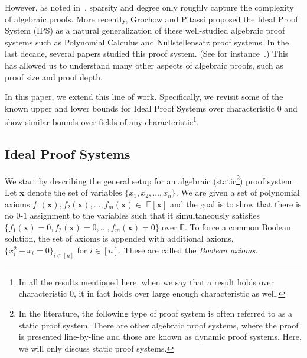 \documentclass[11pt]{article}
\newcommand{\xbar}{\mathbf{x}}
\begin{document}
However, as noted in~\cite{FSTW21}, sparsity and degree only roughly capture the complexity of algebraic proofs. More recently, Grochow and Pitassi \cite{GP14} proposed the Ideal Proof System (IPS) as a natural generalization of these well-studied algebraic proof systems such as Polynomial Calculus and Nullstellensatz proof systems. In the last decade, several papers studied this proof system. (See for instance~\cite{GP14,PitassiTzameretSurvey,FSTW21,GHT,HLT24}.) This has allowed us to understand many other aspects of algebraic proofs, such as proof size and proof depth. 

In this paper, we extend this line of work. Specifically, we revisit some of the known upper and lower bounds for Ideal Proof Systems over characteristic $0$ and show similar bounds over fields of any characteristic\footnote{In all the results mentioned here, when we say that a result holds over characteristic $0$, it in fact holds over large enough characteristic as well.}. 



\subsection{Ideal Proof Systems}
\label{sec:intro-ips}

We start by describing the general setup for an algebraic (static\footnote{In the literature, the following type of proof system is often referred to as a static proof system. There are other algebraic proof systems, where the proof is presented line-by-line and those are known as dynamic proof systems. Here, we will only discuss static proof systems.}) proof system. Let $\xbar$ denote the set of variables $\{x_1, x_2, \ldots, x_n\}$. We are given a set of polynomial axioms $f_1(\mathbf{x}), f_2(\mathbf{x}), \ldots, f_m(\mathbf{x}) \in$ $\mathbb{F}[\mathbf{x}]$ and the goal is to show that there is no $0$-$1$ assignment to the variables such that it simultaneously satisfies $\{f_1(\mathbf{x}) = 0, f_2(\mathbf{x}) = 0, \ldots, f_m(\mathbf{x}) = 0\}$ over $\mathbb{F}$. To force a common Boolean solution, the set of axioms is appended with additional axioms, $\{x_i^2 - x_i =0\}_{i \in [n]}$ for $i \in [n]$. These are called the \emph{Boolean axioms.} 
\end{document}
